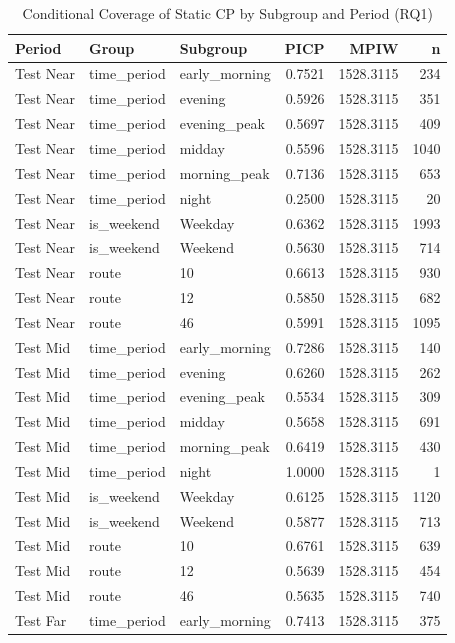 \begin{table}
\caption{Conditional Coverage of Static CP by Subgroup and Period (RQ1)}
\label{tab:t4_3_conditional_coverage}
\begin{tabular}{lllrrr}
\toprule
Period & Group & Subgroup & PICP & MPIW & n \\
\midrule
Test Near & time_period & early_morning & 0.7521 & 1528.3115 & 234 \\
Test Near & time_period & evening & 0.5926 & 1528.3115 & 351 \\
Test Near & time_period & evening_peak & 0.5697 & 1528.3115 & 409 \\
Test Near & time_period & midday & 0.5596 & 1528.3115 & 1040 \\
Test Near & time_period & morning_peak & 0.7136 & 1528.3115 & 653 \\
Test Near & time_period & night & 0.2500 & 1528.3115 & 20 \\
Test Near & is_weekend & Weekday & 0.6362 & 1528.3115 & 1993 \\
Test Near & is_weekend & Weekend & 0.5630 & 1528.3115 & 714 \\
Test Near & route & 10 & 0.6613 & 1528.3115 & 930 \\
Test Near & route & 12 & 0.5850 & 1528.3115 & 682 \\
Test Near & route & 46 & 0.5991 & 1528.3115 & 1095 \\
Test Mid & time_period & early_morning & 0.7286 & 1528.3115 & 140 \\
Test Mid & time_period & evening & 0.6260 & 1528.3115 & 262 \\
Test Mid & time_period & evening_peak & 0.5534 & 1528.3115 & 309 \\
Test Mid & time_period & midday & 0.5658 & 1528.3115 & 691 \\
Test Mid & time_period & morning_peak & 0.6419 & 1528.3115 & 430 \\
Test Mid & time_period & night & 1.0000 & 1528.3115 & 1 \\
Test Mid & is_weekend & Weekday & 0.6125 & 1528.3115 & 1120 \\
Test Mid & is_weekend & Weekend & 0.5877 & 1528.3115 & 713 \\
Test Mid & route & 10 & 0.6761 & 1528.3115 & 639 \\
Test Mid & route & 12 & 0.5639 & 1528.3115 & 454 \\
Test Mid & route & 46 & 0.5635 & 1528.3115 & 740 \\
Test Far & time_period & early_morning & 0.7413 & 1528.3115 & 375 \\

\end{tabular}
\end{table}
